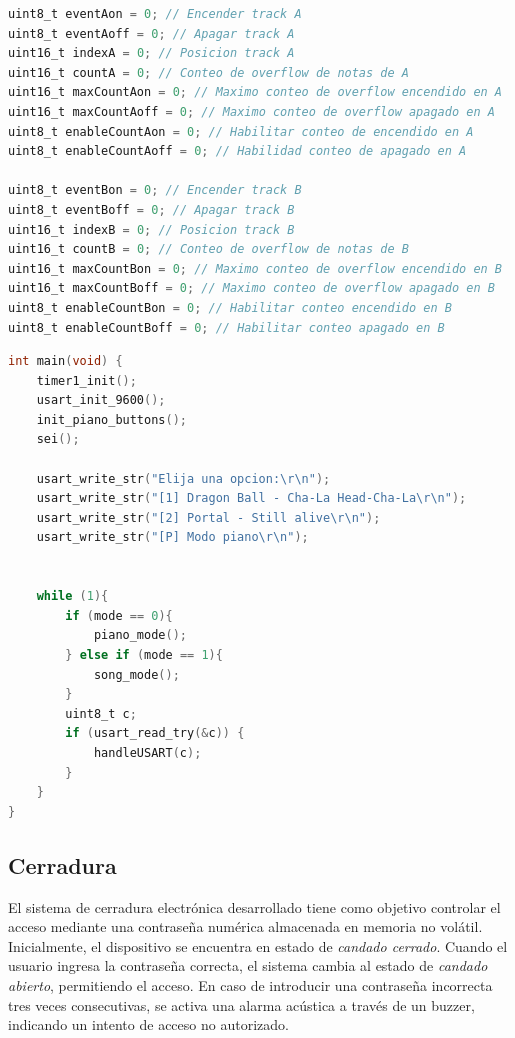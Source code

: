\begin{lstlisting}[language=C, caption={Variables de control de flujo}]
uint8_t eventAon = 0; // Encender track A
uint8_t eventAoff = 0; // Apagar track A
uint16_t indexA = 0; // Posicion track A
uint16_t countA = 0; // Conteo de overflow de notas de A
uint16_t maxCountAon = 0; // Maximo conteo de overflow encendido en A
uint16_t maxCountAoff = 0; // Maximo conteo de overflow apagado en A
uint8_t enableCountAon = 0; // Habilitar conteo de encendido en A
uint8_t enableCountAoff = 0; // Habilidad conteo de apagado en A

uint8_t eventBon = 0; // Encender track B
uint8_t eventBoff = 0; // Apagar track B
uint16_t indexB = 0; // Posicion track B
uint16_t countB = 0; // Conteo de overflow de notas de B
uint16_t maxCountBon = 0; // Maximo conteo de overflow encendido en B
uint16_t maxCountBoff = 0; // Maximo conteo de overflow apagado en B
uint8_t enableCountBon = 0; // Habilitar conteo encendido en B
uint8_t enableCountBoff = 0; // Habilitar conteo apagado en B
\end{lstlisting}

\begin{lstlisting}[language=C, caption={Variables de control de flujo}]
int main(void) {
	timer1_init();
	usart_init_9600();
	init_piano_buttons();
	sei();
	
	usart_write_str("Elija una opcion:\r\n");
	usart_write_str("[1] Dragon Ball - Cha-La Head-Cha-La\r\n");
	usart_write_str("[2] Portal - Still alive\r\n");
	usart_write_str("[P] Modo piano\r\n");

	
	while (1){
		if (mode == 0){
			piano_mode();
		} else if (mode == 1){
			song_mode();
		}
	    uint8_t c;
	    if (usart_read_try(&c)) {
		    handleUSART(c);
	    }
	}
}
\end{lstlisting}



\subsection{Cerradura}

El sistema de cerradura electrónica desarrollado tiene como objetivo controlar el acceso mediante una contraseña numérica almacenada en memoria no volátil. Inicialmente, el dispositivo se encuentra en estado de \textit{candado cerrado}. Cuando el usuario ingresa la contraseña correcta, el sistema cambia al estado de \textit{candado abierto}, permitiendo el acceso. En caso de introducir una contraseña incorrecta tres veces consecutivas, se activa una alarma acústica a través de un buzzer, indicando un intento de acceso no autorizado.

